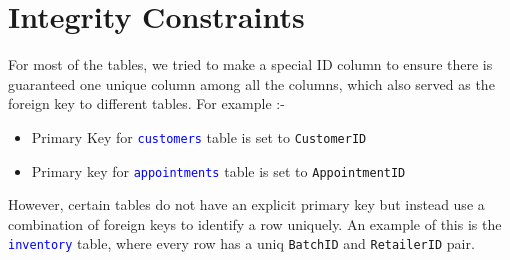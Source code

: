 \documentclass{article}
\begin{document}
\section{Integrity Constraints}

For most of the tables, we tried to make a special ID column to ensure there is guaranteed one unique column among all the columns, which also served as the foreign key to different tables.
For example :-
\begin{itemize}
    \item Primary Key for \textcolor{blue}{\texttt{customers}} table is set to \texttt{CustomerID}
    \item Primary key for \textcolor{blue}{\texttt{appointments}} table is set to \texttt{AppointmentID}
\end{itemize}

However, certain tables do not have an explicit primary key but instead use a combination of foreign keys to identify a row uniquely. An example of this is the \textcolor{blue}{\texttt{inventory}} table, where every row has a uniq \texttt{BatchID} and \texttt{RetailerID} pair. 
\end{document}

